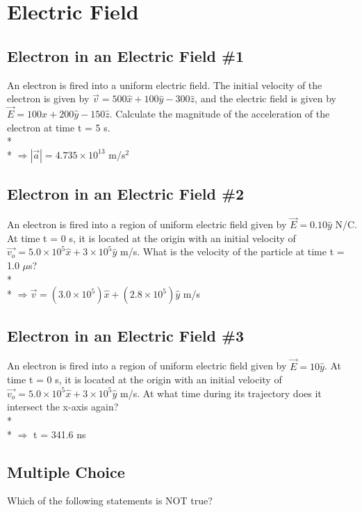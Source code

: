 \documentclass[11pt]{article}
\begin{document}

\pagebreak
\section{Electric Field}
\vspace{10pt}

\subsection{Electron in an Electric Field \#1}
An electron is fired into a uniform electric field.  The initial velocity of the electron is given by $\vec{v} = 500 \hat{x} + 100 \hat{y} - 300 \hat{z}$, and the electric field is given by $\vec{E} = 100 \hat{x} + 200 \hat{y} - 150 \hat{z}$.  Calculate the magnitude of the acceleration of the electron at time t = 5 s. \\* \\*
$\Rightarrow |\vec{a}| = 4.735 \times 10^{13}$ m/s$^2$

\subsection{Electron in an Electric Field \#2}
An electron is fired into a region of uniform electric field given by $\vec{E} = 0.10\hat{y}$ N/C. At time t = 0 s, it is located at the origin with an initial velocity of $\vec{v_o} = 5.0 \times 10^5 \hat{x} + 3 \times 10^5 \hat{y}$  m/s.  What is the velocity of the particle at time t = 1.0 $\mu$s? \\* \\*
$\Rightarrow \vec{v} = (3.0\times10^5)\hat{x} + (2.8\times10^5)\hat{y}$ m/s

\subsection{Electron in an Electric Field \#3}
An electron is fired into a region of uniform electric field given by $\vec{E} = 10\hat{y}$. At time t = 0 s, it is located at the origin with an initial velocity of $\vec{v_o} = 5.0 \times 10^5 \hat{x} + 3 \times 10^5 \hat{y}$ m/s.  At what time during its trajectory does it intersect the x-axis again? \\* \\*
$\Rightarrow$ t = 341.6 ns

\subsection{Multiple Choice}
Which of the following statements is NOT true?
\end{document}
